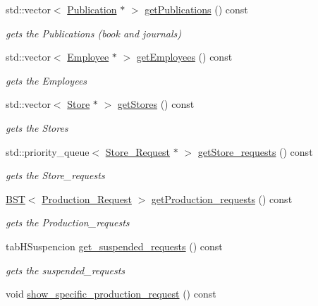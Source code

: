 \begin{DoxyCompactItemize}
std\+::vector$<$ \hyperlink{class_publication}{Publication} $\ast$ $>$ \hyperlink{class_headquarters_a71a68cac0db5c9aa33b548f4b696b9bc}{get\+Publications} () const
\begin{DoxyCompactList}\small\item\em gets the Publications (book and journals) \end{DoxyCompactList}\item 
std\+::vector$<$ \hyperlink{class_employee}{Employee} $\ast$ $>$ \hyperlink{class_headquarters_a0d5357a865f5ccdf194404b97f04816a}{get\+Employees} () const
\begin{DoxyCompactList}\small\item\em gets the Employees \end{DoxyCompactList}\item 
std\+::vector$<$ \hyperlink{class_store}{Store} $\ast$ $>$ \hyperlink{class_headquarters_a37aa3d25dcd693e6537a0bdd361942d8}{get\+Stores} () const
\begin{DoxyCompactList}\small\item\em gets the Stores \end{DoxyCompactList}\item 
std\+::priority\+\_\+queue$<$ \hyperlink{class_store___request}{Store\+\_\+\+Request} $\ast$ $>$ \hyperlink{class_headquarters_af7a7c90b995178f8417d3523cd67a3a2}{get\+Store\+\_\+requests} () const
\begin{DoxyCompactList}\small\item\em gets the Store\+\_\+requests \end{DoxyCompactList}\item 
\hyperlink{class_b_s_t}{B\+ST}$<$ \hyperlink{class_production___request}{Production\+\_\+\+Request} $>$ \hyperlink{class_headquarters_a27b1b95a72714a75ad464f60d0b86b38}{get\+Production\+\_\+requests} () const
\begin{DoxyCompactList}\small\item\em gets the Production\+\_\+requests \end{DoxyCompactList}\item 
tab\+H\+Suspencion \hyperlink{class_headquarters_a4ef55855baa94581a9987c47498a49e7}{get\+\_\+suspended\+\_\+requests} () const
\begin{DoxyCompactList}\small\item\em gets the suspended\+\_\+requests \end{DoxyCompactList}\item 
void \hyperlink{class_headquarters_a37e4e11312300680864e338cb0633875}{show\+\_\+specific\+\_\+production\+\_\+request} () const

\end{DoxyCompactItemize}
